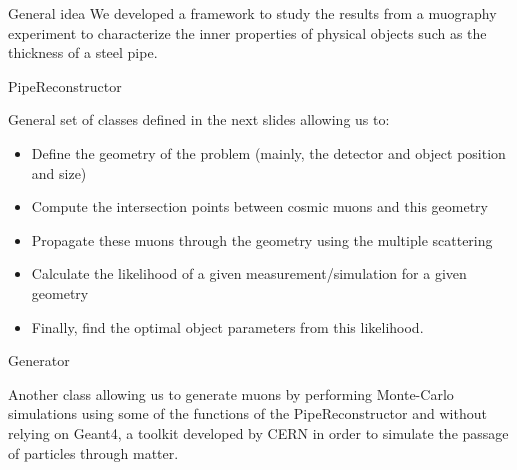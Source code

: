 \documentclass[handout,8 pt]{beamer}
\begin{document}
\begin{frame}{General idea}
We developed a framework to study the results from a muography experiment to characterize the inner properties of physical objects such as the thickness of a steel pipe. \vfill
\begin{exampleblock}{} PipeReconstructor \end{exampleblock}
\justifying
General set of classes defined in the next slides allowing us to:
\begin{itemize}
\justifying
\item Define the geometry of the problem (mainly, the detector and object position and size)
\item Compute the intersection points between cosmic muons and this geometry
\item Propagate these muons through the geometry using the multiple scattering
\item Calculate the likelihood of a given measurement/simulation for a given geometry
\item Finally, find the optimal object parameters from this likelihood.
\end{itemize} \vfill

\begin{exampleblock}{} Generator \end{exampleblock}
\justifying
Another class allowing us to generate muons by performing Monte-Carlo simulations using some of the functions of the PipeReconstructor and without relying on Geant4, a toolkit developed by CERN in order to simulate the passage of particles through matter. \vfill

\end{frame}
\end{document}
